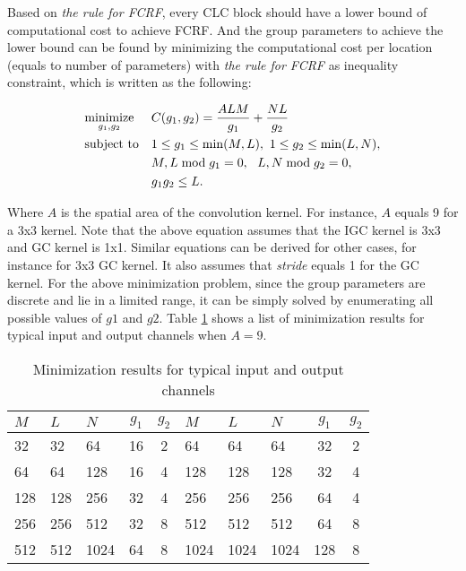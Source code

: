 \documentclass[10pt,twocolumn,letterpaper]{article}
\begin{document}
Based on \textit{the rule for FCRF}, every CLC block should have a lower bound of computational cost to achieve FCRF.  And the group parameters to achieve the lower bound can be found by minimizing the computational cost per location (equals to number of parameters) with \textit{the rule for FCRF} as inequality constraint, which is written as the following:

\begin{align}
& \underset{g_1,g_2}{\text{minimize}} & & C(g_1,g_2) = \frac{ALM}{g_1} + \frac{NL}{g_2} \label{eq:min_cost} \\
\notag& \text{subject to} & & 1\le{g_1}\le{\min(M,L)},\  1\le{g_2}\le{\min(L,N)}, \\
\notag&&& M,L \bmod g_1=0,\ \ L,N\bmod g_2=0, \\
\notag&&& g_1g_2\le{L}.
\end{align}

Where $A$ is the spatial area of the convolution kernel. For instance, $A$ equals 9 for a 3x3 kernel. Note that the above equation assumes that the IGC kernel is 3x3 and GC kernel is 1x1. Similar equations can be derived for other cases, for instance for 3x3 GC kernel. It also assumes that \textit{stride} equals 1 for the GC kernel. For the above minimization problem,  since the group parameters are discrete and lie in a limited range, it can be simply solved by enumerating all possible values of $g1$ and $g2$. Table \ref{tb:fcrf} shows a list of minimization results for typical input and output channels when $A=9$.
\begin{table}[h!]\scriptsize
\begin{center}
\begin{tabular}{|l|l|l||c|c|||l|l|l||c|c|}
\hline
$M$ & $L$ & $N$ & $g_1$ & $g_2$ & $M$ & $L$ & $N$ & $g_1$ & $g_2$ \\
\hline\hline
32 & 32 & 64 & 16 & 2 & 64 & 64 & 64 & 32 & 2 \\
\hline
64 & 64 & 128 & 16 & 4 & 128 & 128 & 128 & 32 & 4 \\
\hline
128 & 128 & 256 & 32 & 4 & 256 & 256 & 256 & 64 & 4 \\
\hline
256 & 256 & 512 & 32 & 8 & 512 & 512 & 512 & 64 & 8 \\
\hline
512 & 512 & 1024 & 64 & 8 & 1024 & 1024 & 1024 & 128 & 8 \\
\hline
\end{tabular}
\end{center}
\caption{Minimization results for typical input and output channels}
\label{tb:fcrf}
\end{table}
\end{document}
